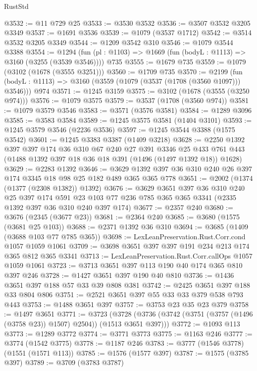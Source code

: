 \begin{lexlean}{RustStd}
\begin{coremodule}
{\begin{coremodule}
{{{{{{{{{{@3532 := @11 @729 @25
@3533 := @3530 @3532
@3536 := @3507 @3532 @3205 @3349
@3537 := @1691 @3536
@3539 := @1079 (@3537 @1712)
@3542 := @3514 @3532 @3205 @3349
@3544 := @1209 @3542 @310
@3546 := @1079 @3544 @3388
@3554 := @1294 (fun (pl : @1103) => @1669 (fun (bodyL : @1113) => @3160 (@3255 (@3539 @3546)))) @735
@3555 := @1679 @735
@3559 := @1079 (@3102 (@1678 (@3555 @3251)))
@3560 := @1709 @735
@3570 := @2199
    (fun (bodyL : @1113) => @3160 (@3559 (@1079 (@3537 (@1708 (@3560 @1097))) @3546)))
    @974
@3571 := @1245 @3159
@3575 := @3102 (@1678 (@3555 (@3250 @974)))
@3576 := @1079 @3575
@3579 := @3537 (@1708 (@3560 @974))
@3581 := @1079 @3579 @3546
@3583 := @3571 (@3576 @3581)
@3584 := @1289 @3096
@3585 := @3583 @3584
@3589 := @1245 @3575 @3581 (@1404 @3101)
@3593 := @1245 @3579 @3546 (@2236 @3536)
@3597 := @1245 @3544 @3388 (@1575 @3542)
@3601 := @1245 @3383 @3387 (@1409 @3218)
@3628 := @2250
    @1392
    @397
    @397
    @174
    @36
    @310
    @67
    @240
    @27
    @391
    @3346
    @25
    @433
    @761
    @443
    (@1488 @1392 @397 @18 @36 @18 @391 (@1496 (@1497 @1392 @18)) @1628)
@3629 := @2283 @1392
@3646 := @3629 @1392 @397 @36 @310 @240 @26 @397 @174 @3345 @18 @98 @25 @182 @489 @365 @365 @778
@3651 := @2002 (@1374 (@1377 (@2308 @1382)) @1392)
@3676 := @3629
    @3651
    @397
    @36
    @310
    @240
    @25
    @397
    @174
    @591
    @23
    @103
    @77
    @236
    @785
    @365
    @365
    @3341
    (@2335 @1392 @397 @36 @310 @240 @397 @174)
@3677 := @2357 @240
@3680 := @3676 (@2345 (@3677 @23))
@3681 := @2364 @240
@3685 := @3680 (@1575 (@3681 @25 @103))
@3688 := @2371 @1392 @36 @310
@3694 := @3685 (@1409 (@3688 @103 @77 @785 @365))
@3698 := LexLeanPreservation.Rust.Corr.cond @1057 @1059 @1061
@3709 := @3698 @3651 @397 @397 @191 @234 @213 @174 @365 @812 @365 @3341
@3713 := LexLeanPreservation.Rust.Corr.callOps @1057 @1059 @1061
@3723 := @3713 @3651 @397 @113 @190 @40 @174 @365 @810 @397 @246
@3728 := @1427 @3651 @397 @190 @40 @810
@3736 := @1436 @3651 @397 @188 @57 @33 @39 @808 @381
@3742 := @2425 @3651 @397 @188 @33 @804 @806
@3751 := @2521 @3651 @397 @55 @33 @33 @379 @538 @793 @443
@3753 := @1488 @3651 @397
@3757 := @3753 @23 @35 @23 @379
@3758 := @1497 @3651
@3771 := @3723
    (@3728 (@3736 (@3742 (@3751 (@3757 (@1496 (@3758 @23)) @1507) @2504)) (@1513 @3651 @397)))
@3772 := @1093 @113
@3773 := @1289 @3772
@3774 := @3771 @3773
@3775 := @1163 @246
@3777 := @3774 (@1542 @3775)
@3778 := @1187 @246
@3783 := @3777 (@1546 @3778) (@1551 (@1571 @113))
@3785 := @1576 (@1577 @397)
@3787 := @1575 (@3785 @397)
@3789 := @3709 (@3783 @3787)
}}}}}}}}}}
\end{coremodule}}
\end{coremodule}
\end{lexlean}

